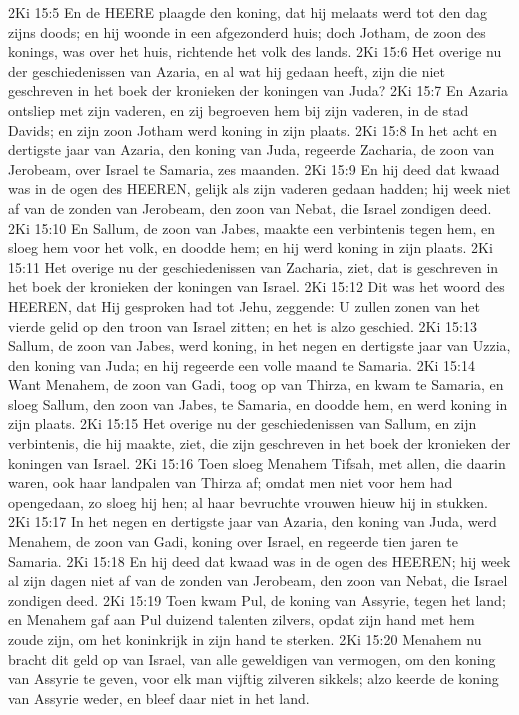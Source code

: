 2Ki 15:5  En de HEERE plaagde den koning, dat hij melaats werd tot den dag zijns doods; en hij woonde in een afgezonderd huis; doch Jotham, de zoon des konings, was over het huis, richtende het volk des lands.
2Ki 15:6  Het overige nu der geschiedenissen van Azaria, en al wat hij gedaan heeft, zijn die niet geschreven in het boek der kronieken der koningen van Juda?
2Ki 15:7  En Azaria ontsliep met zijn vaderen, en zij begroeven hem bij zijn vaderen, in de stad Davids; en zijn zoon Jotham werd koning in zijn plaats.
2Ki 15:8  In het acht en dertigste jaar van Azaria, den koning van Juda, regeerde Zacharia, de zoon van Jerobeam, over Israel te Samaria, zes maanden.
2Ki 15:9  En hij deed dat kwaad was in de ogen des HEEREN, gelijk als zijn vaderen gedaan hadden; hij week niet af van de zonden van Jerobeam, den zoon van Nebat, die Israel zondigen deed.
2Ki 15:10  En Sallum, de zoon van Jabes, maakte een verbintenis tegen hem, en sloeg hem voor het volk, en doodde hem; en hij werd koning in zijn plaats.
2Ki 15:11  Het overige nu der geschiedenissen van Zacharia, ziet, dat is geschreven in het boek der kronieken der koningen van Israel.
2Ki 15:12  Dit was het woord des HEEREN, dat Hij gesproken had tot Jehu, zeggende: U zullen zonen van het vierde gelid op den troon van Israel zitten; en het is alzo geschied.
2Ki 15:13  Sallum, de zoon van Jabes, werd koning, in het negen en dertigste jaar van Uzzia, den koning van Juda; en hij regeerde een volle maand te Samaria.
2Ki 15:14  Want Menahem, de zoon van Gadi, toog op van Thirza, en kwam te Samaria, en sloeg Sallum, den zoon van Jabes, te Samaria, en doodde hem, en werd koning in zijn plaats.
2Ki 15:15  Het overige nu der geschiedenissen van Sallum, en zijn verbintenis, die hij maakte, ziet, die zijn geschreven in het boek der kronieken der koningen van Israel.
2Ki 15:16  Toen sloeg Menahem Tifsah, met allen, die daarin waren, ook haar landpalen van Thirza af; omdat men niet voor hem had opengedaan, zo sloeg hij hen; al haar bevruchte vrouwen hieuw hij in stukken.
2Ki 15:17  In het negen en dertigste jaar van Azaria, den koning van Juda, werd Menahem, de zoon van Gadi, koning over Israel, en regeerde tien jaren te Samaria.
2Ki 15:18  En hij deed dat kwaad was in de ogen des HEEREN; hij week al zijn dagen niet af van de zonden van Jerobeam, den zoon van Nebat, die Israel zondigen deed.
2Ki 15:19  Toen kwam Pul, de koning van Assyrie, tegen het land; en Menahem gaf aan Pul duizend talenten zilvers, opdat zijn hand met hem zoude zijn, om het koninkrijk in zijn hand te sterken.
2Ki 15:20  Menahem nu bracht dit geld op van Israel, van alle geweldigen van vermogen, om den koning van Assyrie te geven, voor elk man vijftig zilveren sikkels; alzo keerde de koning van Assyrie weder, en bleef daar niet in het land.
